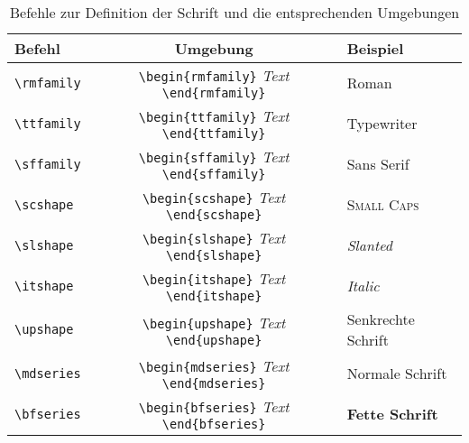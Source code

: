 \begin{table}[h!tb]
\centering
\caption{Befehle zur Definition der Schrift und die entsprechenden Umgebungen}
\label{Tabelle_SchriftfamilieSchriftschnittOhneArgument}       %
\begin{tabular}{lcl}
\hline
Befehl & Umgebung & Beispiel \\
\hline
\texttt{\textbackslash rmfamily} & \texttt{\textbackslash begin\{rmfamily\}} \enskip \textsl{Text} \enskip \texttt{\textbackslash end\{rmfamily\}} & {\rmfamily Roman} \\
\texttt{\textbackslash ttfamily} & \texttt{\textbackslash begin\{ttfamily\}} \enskip \textsl{Text} \enskip \texttt{\textbackslash end\{ttfamily\}} & {\ttfamily Typewriter} \\
\texttt{\textbackslash sffamily} & \texttt{\textbackslash begin\{sffamily\}} \enskip \textsl{Text} \enskip \texttt{\textbackslash end\{sffamily\}} & {\sffamily Sans Serif} \\
\texttt{\textbackslash scshape} & \texttt{\textbackslash begin\{scshape\}} \enskip \textsl{Text} \enskip \texttt{\textbackslash end\{scshape\}} & {\scshape Small Caps} \\
\texttt{\textbackslash slshape} & \texttt{\textbackslash begin\{slshape\}} \enskip \textsl{Text} \enskip \texttt{\textbackslash end\{slshape\}} & {\slshape Slanted} \\
\texttt{\textbackslash itshape} & \texttt{\textbackslash begin\{itshape\}} \enskip \textsl{Text} \enskip \texttt{\textbackslash end\{itshape\}} & {\itshape Italic} \\
\texttt{\textbackslash upshape} & \texttt{\textbackslash begin\{upshape\}} \enskip \textsl{Text} \enskip \texttt{\textbackslash end\{upshape\}} & {\upshape Senkrechte Schrift} \\
\texttt{\textbackslash mdseries} & \texttt{\textbackslash begin\{mdseries\}} \enskip \textsl{Text} \enskip \texttt{\textbackslash end\{mdseries\}} & {\mdseries Normale Schrift} \\
\texttt{\textbackslash bfseries} & \texttt{\textbackslash begin\{bfseries\}} \enskip \textsl{Text} \enskip \texttt{\textbackslash end\{bfseries\}} & {\bfseries Fette Schrift} \\
\hline
\end{tabular}
\end{table}

